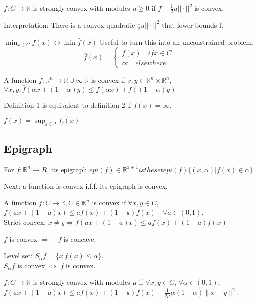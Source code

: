 \documentclass[11pt,fleqn]{book} %
\def\R{\mathbb{R}}
\begin{document}
\begin{definition}
$f:C \to \R$ is strongly convex with modules $u \ge 0$ if $f - \frac{1}{2}u || \cdot ||^2$ is convex.
\end{definition}
Interpretation: There is a convex quadratic $\frac{1}{2}u || \cdot ||^2$ that lower bounds f.
\begin{example}
$\min_{x \in C} f(x) \leftrightarrow \min \bar{f}(x)$
Useful to turn this into an unconstrained problem. \\
$$\bar{f}(x) = \begin{cases}
f(x) \quad if x \in C \\
\infty \quad  elsewhere
\end{cases}$$
\end{example}
\begin{definition}
A function $f : \R^n \to \R \cup \infty \ \bar{\R}$ is convex if $x,y \in \R^n \times \R^n$, $\forall x,y , \bar{f}(\alpha x + (1-\alpha) y) \le f(\alpha x) + f((1-\alpha) y)$
\end{definition}
Definition 1 is equivalent to definition 2 if $f(x) = \infty$.
\begin{example}
$f(x) = \sup_{j \in J} f_j(x)$
\end{example}

\subsection{Epigraph} 
\begin{definition}[Epigraph]
For $f: \R^n \rightarrow \bar{R}$, its epigraph $epi(f) \in \R^{n+1} is the set epi(f) \{ (x,\alpha) | f(x) \in \alpha \}$
\end{definition}
Next: a function is convex i.f.f. its epigraph is convex.

\begin{definition}
A function $f : C \rightarrow \R, C \in \R^n$ is convex if $\forall x, y \in C$, $f(ax + (1-a)x) \le af(x) + (1-a)f(x) \quad \forall a \in (0,1)$.\\ 
Strict convex: $x \neq y \Rightarrow f(ax + (1-a)x) \le af(x) + (1-a)f(x) $
\end{definition}
\begin{remark}
$f$ is convex $\Rightarrow$ $-f$ is concave.
\end{remark}
Level set: $S_{\alpha}f = \{ x | f(x) \le \alpha \}$.\\ 
$S_{\alpha}f$ is convex $\Leftrightarrow$ $f$ is convex. \\
\begin{definition}
$f : C \rightarrow \R$ is strongly convex with modules $\mu$ if $\forall x, y \in C$, $\forall \alpha \in (0,1)$, $f(ax + (1-a)x) \le af(x) + (1-a)f(x) - \frac{1}{2\mu}\alpha(1- \alpha) \|x-y\|^2$.
\end{definition}
\end{document}
